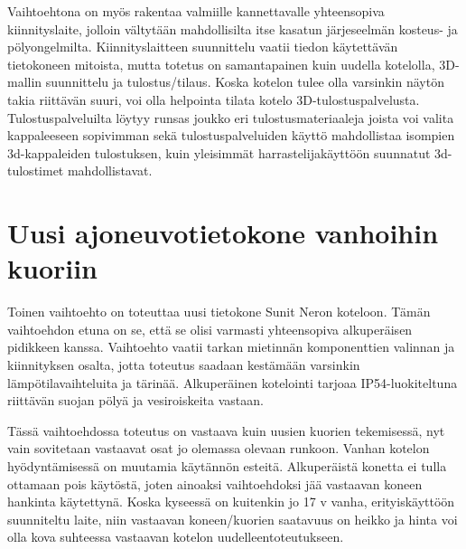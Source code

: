 Vaihtoehtona on myös rakentaa valmiille kannettavalle yhteensopiva kiinnityslaite, jolloin vältytään mahdollisilta itse kasatun järjeseelmän kosteus- ja pölyongelmilta. Kiinnityslaitteen suunnittelu vaatii tiedon käytettävän tietokoneen mitoista, mutta totetus on samantapainen kuin uudella kotelolla, 3D-mallin suunnittelu ja tulostus/tilaus. Koska kotelon tulee olla varsinkin näytön takia riittävän suuri, voi olla helpointa tilata kotelo 3D-tulostuspalvelusta. Tulostuspalveluilta löytyy runsas joukko eri tulostusmateriaaleja joista voi valita kappaleeseen sopivimman sekä tulostuspalveluiden käyttö mahdollistaa isompien 3d-kappaleiden tulostuksen, kuin yleisimmät harrastelijakäyttöön suunnatut 3d-tulostimet mahdollistavat. \cite{3d_shapeways} \cite{3d_ultimaker}



\section{Uusi ajoneuvotietokone vanhoihin kuoriin}

Toinen vaihtoehto on toteuttaa uusi tietokone Sunit Neron koteloon. Tämän vaihtoehdon etuna on se, että se olisi varmasti yhteensopiva alkuperäisen pidikkeen kanssa. Vaihtoehto vaatii tarkan mietinnän komponenttien valinnan ja kiinnityksen osalta, jotta toteutus saadaan kestämään varsinkin lämpötilavaihteluita ja tärinää. Alkuperäinen kotelointi tarjoaa IP54-luokiteltuna riittävän suojan pölyä ja vesiroiskeita vastaan.

Tässä vaihtoehdossa toteutus on vastaava kuin uusien kuorien tekemisessä, nyt vain sovitetaan vastaavat osat jo olemassa olevaan runkoon. Vanhan kotelon hyödyntämisessä on muutamia käytännön esteitä. Alkuperäistä konetta ei tulla ottamaan pois käytöstä, joten ainoaksi vaihtoehdoksi jää vastaavan koneen hankinta käytettynä. Koska kyseessä on kuitenkin jo 17 v vanha, erityiskäyttöön suunniteltu laite, niin vastaavan koneen/kuorien saatavuus on heikko ja hinta voi olla kova suhteessa vastaavan kotelon uudelleentoteutukseen.



